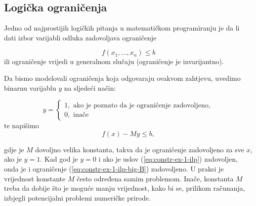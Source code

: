 \documentclass[a4paper, utf8, 11pt, colorlinks]{book}
\theoremstyle{definition}
\begin{document}

\subsection{Logička ograničenja}
Jedno od najprostijih logičkih pitanja u matematičkom programiranju je da li dati izbor varijabli odluka zadovoljava ograničenje

\begin{equation}\label{eq:constr-ex-1-ilp}
   f(x_1,\ldots, x_n )\leq b
\end{equation}
 ili   ograničenje vrijedi u generalnom slučaju (ograničenje je invarijantno). 
 
 Da bismo modelovali ograničenja koja odgovaraju ovakvom zahtjevu, uvedimo binarnu varijablu $y$ na sljedeći način:
 
$$y =\begin{cases}
1, \mbox{ ako je poznato da je ograničenje zadovoljeno}, \\
0, \mbox{ inače}
\end{cases}$$
te napišimo 
\begin{equation}\label{eq:constr-ex-1-ilp-big-B}
   f(x) - M y \leq b,
\end{equation}

gdje je $M$ dovoljno velika konstanta, takva da je 
ograničenje zadovoljeno za sve $x$, ako je $y =1$. Kad god je $y=0$ i ako je uslov (\ref{eq:constr-ex-1-ilp}) zadovoljen, onda je i ograničenje (\ref{eq:constr-ex-1-ilp-big-B}) zadovoljeno. U praksi je vrijednost  konstante $M$ često određena samim problemom. Inače, konstanta $M$ treba da dobije što je moguće manju vrijednost, kako bi se, prilikom računanja, izbjegli potencijalni problemi numeričke prirode. 
\end{document}
